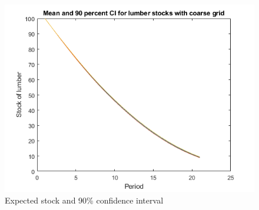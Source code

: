 \documentclass[12pt]{article}
\begin{document}
\clearpage
\begin{figure}[h]
\includegraphics[width=\textwidth]{ci2.png}
\caption{Expected stock and 90\% confidence interval}
\end{figure}
\end{document}
